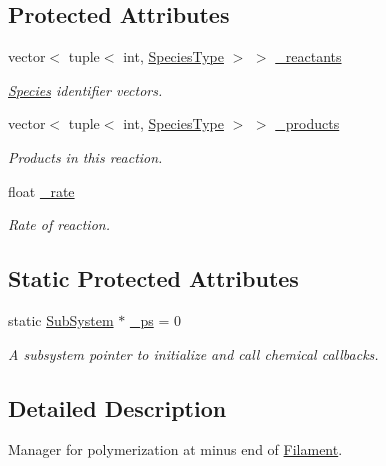 \subsection*{Protected Attributes}
\begin{DoxyCompactItemize}
\item 
vector$<$ tuple$<$ int, \hyperlink{Species_8h_a50651af47c56ea0e27235468d23542cf}{Species\+Type} $>$ $>$ \hyperlink{classInternalFilamentRxnManager_a63de9061c3da4ad03cf4c530d2774979}{\+\_\+reactants}
\begin{DoxyCompactList}\small\item\em \hyperlink{classSpecies}{Species} identifier vectors. \end{DoxyCompactList}\item 
vector$<$ tuple$<$ int, \hyperlink{Species_8h_a50651af47c56ea0e27235468d23542cf}{Species\+Type} $>$ $>$ \hyperlink{classInternalFilamentRxnManager_afd213da1a3706e2e88962e5da886a5dc}{\+\_\+products}
\begin{DoxyCompactList}\small\item\em Products in this reaction. \end{DoxyCompactList}\item 
float \hyperlink{classInternalFilamentRxnManager_a8b98dd9e6f5d016149f5434b891806df}{\+\_\+rate}
\begin{DoxyCompactList}\small\item\em Rate of reaction. \end{DoxyCompactList}\end{DoxyCompactItemize}
\subsection*{Static Protected Attributes}
\begin{DoxyCompactItemize}
\item 
static \hyperlink{classSubSystem}{Sub\+System} $\ast$ \hyperlink{classInternalFilamentRxnManager_a973ce9cc2aae811e6867afa46193c5f2}{\+\_\+ps} = 0
\begin{DoxyCompactList}\small\item\em A subsystem pointer to initialize and call chemical callbacks. \end{DoxyCompactList}\end{DoxyCompactItemize}


\subsection{Detailed Description}
Manager for polymerization at minus end of \hyperlink{classFilament}{Filament}. 

